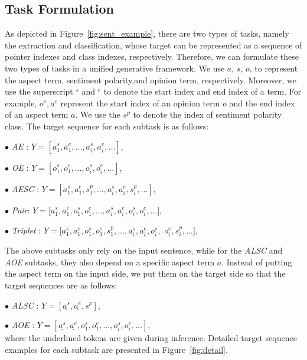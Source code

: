 \documentclass[11pt,a4paper]{article}
\begin{document}
\subsection{Task Formulation}
As depicted in Figure~\ref{fig:sent_example}, there are two types of tasks, namely the extraction and classification, whose target can be represented as a sequence of pointer indexes and class indexes, respectively. Therefore, we can formulate these two types of tasks in a unified generative framework. We use  $a$, $s$, $o$, to represent the  aspect term, sentiment polarity,and opinion term, respectively. Moreover, we use the superscript $^s$ and $^e$ to denote the start index and end index of a term. For example, $o^s, a^e$ represent the start index of an opinion term $o$ and the end index of an aspect term $a$. We use the $s^p$ to denote the index of sentiment polarity class. The target sequence for each subtask is as follows:

$\bullet$ \emph{AE} : $Y=[a_1^s, a_1^e, ..., a_i^s, a_i^e, ...]$,

$\bullet$ \emph{OE} : $Y=[o_1^s, o_1^e, ..., o_i^s, o_i^e, ...]$,

$\bullet$ \emph{AESC} : $Y=[a_1^s, a_1^e, s^p_1, ..., a_i^s, a_i^e, s^p_i, ...]$,

$\bullet$  \emph{Pair}: $Y=[a_1^s, a_1^e, o_1^s, o_1^e, ..., a_i^s, a_i^e, o_i^s, o_i^e,$$...]$,

$\bullet$ \emph{Triplet} : $Y=[a_1^s, a_1^e, o_1^s, o_1^e, s^p_1, ..., a_i^s, a_i^e, o_i^s, $ $o_i^e, s^p_i, ...]$,

The above subtasks only rely on the input sentence, while for the \emph{ALSC} and \emph{AOE}  subtasks, they also depend on a specific aspect term $a$. Instead of putting the aspect term on the input side, we put them on the target side so that the target sequences are as follows:

$\bullet$ \emph{ALSC} : $Y=[\underline{a^s}, \underline{a^e}, s^p]$,

$\bullet$ \emph{AOE} : $Y=[\underline{a^s}, \underline{a^e}, o_1^s, o_1^e, ..., o_i^s, o_i^e, ...]$,\\
where the underlined tokens are given during inference. Detailed target sequence examples for each subtask are presented in Figure~\ref{fig:detail}.
\end{document}

